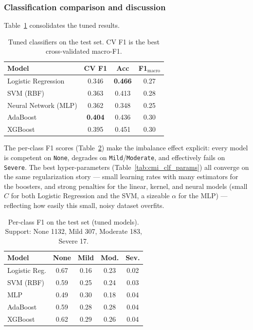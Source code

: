 \subsubsection{Classification comparison and discussion}
Table~\ref{tab:cmi_clf} consolidates the tuned results.

\begin{table}[H]
\centering
\small
\caption{Tuned classifiers on the test set. CV F1 is the best cross-validated macro-F1.}
\label{tab:cmi_clf}
\begin{tabular}{l c c c}
\hline
Model & CV F1 & Acc & F1$_{\text{macro}}$ \\
\hline
Logistic Regression & 0.346 & \textbf{0.466} & 0.27 \\
SVM (RBF)           & 0.363 & 0.413 & 0.28 \\
Neural Network (MLP)& 0.362 & 0.348 & 0.25 \\
AdaBoost            & \textbf{0.404} & 0.436 & 0.30 \\
XGBoost             & 0.395 & 0.451 & 0.30 \\
\hline
\end{tabular}
\end{table}

The per-class F1 scores (Table~\ref{tab:cmi_perclass}) make the imbalance effect explicit: every model is competent on \texttt{None}, degrades on \texttt{Mild}/\texttt{Moderate}, and effectively fails on \texttt{Severe}. The best hyper-parameters (Table~\ref{tab:cmi_clf_params}) all converge on the same regularization story --- small learning rates with many estimators for the boosters, and strong penalties for the linear, kernel, and neural models (small $C$ for both Logistic Regression and the SVM, a sizeable $\alpha$ for the MLP) --- reflecting how easily this small, noisy dataset overfits.

\begin{table}[H]
\centering
\small
\caption{Per-class F1 on the test set (tuned models). Support: None 1132, Mild 307, Moderate 183, Severe 17.}
\label{tab:cmi_perclass}
\begin{tabular}{l c c c c}
\hline
Model & None & Mild & Mod. & Sev. \\
\hline
Logistic Reg. & 0.67 & 0.16 & 0.23 & 0.02 \\
SVM (RBF)     & 0.59 & 0.25 & 0.24 & 0.03 \\
MLP           & 0.49 & 0.30 & 0.18 & 0.04 \\
AdaBoost      & 0.59 & 0.28 & 0.28 & 0.04 \\
XGBoost       & 0.62 & 0.29 & 0.26 & 0.04 \\
\hline
\end{tabular}
\end{table}

